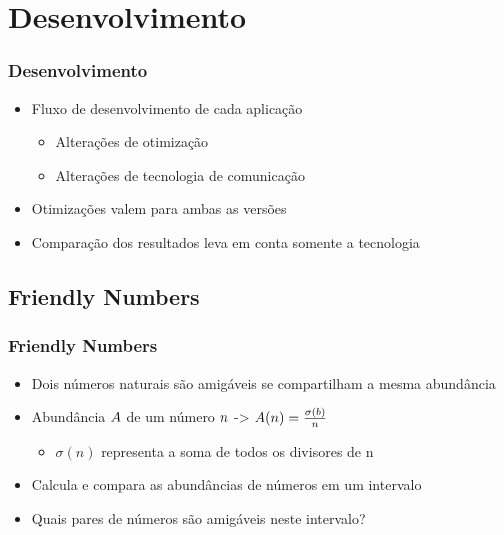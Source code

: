\documentclass[xcolor={table}]{beamer}
\begin{document}
\section{Desenvolvimento}
\begin{frame}\frametitle{Desenvolvimento}
    \begin{itemize}
        \item Fluxo de desenvolvimento de cada aplicação
        \begin{itemize}
            \item Alterações de otimização
            \item Alterações de tecnologia de comunicação
        \end{itemize}
        \item Otimizações valem para ambas as versões
        \item Comparação dos resultados leva em conta somente a tecnologia
    \end{itemize}
\end{frame}

\subsection{Friendly Numbers}
\begin{frame}\frametitle{Friendly Numbers}
    \begin{itemize}
        \item Dois números naturais são amigáveis se compartilham a mesma abundância
        \item {Abundância $\mathnormal{A}$ de um número $\mathnormal{n}$ -> $\mathnormal{A(n) = \frac{\sigma(b)}{n}}$}
        \begin{itemize}
            \item {$\sigma(n)$ representa a soma de todos os divisores de n}
        \end{itemize}
        \item Calcula e compara as abundâncias de números em um intervalo
        \item Quais pares de números são amigáveis neste intervalo?
    \end{itemize}
\end{frame}
\end{document}

